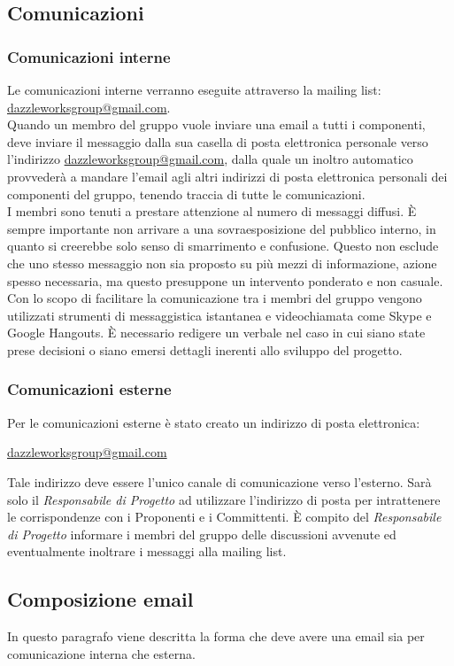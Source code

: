 	\subsection{Comunicazioni}
		\subsubsection{Comunicazioni interne}
Le comunicazioni interne verranno eseguite attraverso la mailing list: \url{dazzleworksgroup@gmail.com}. \\ 
Quando un membro del gruppo vuole inviare una email a tutti i componenti, deve inviare il messaggio dalla sua casella di posta elettronica personale verso l'indirizzo \url{dazzleworksgroup@gmail.com}, dalla quale un inoltro automatico provvederà a mandare l'email agli altri indirizzi di posta elettronica personali dei componenti del gruppo, tenendo traccia di tutte le comunicazioni.\\ 
I membri sono tenuti a prestare attenzione al numero di messaggi diffusi. È sempre importante non arrivare a una sovraesposizione del pubblico interno, in quanto si creerebbe solo senso di smarrimento e confusione. Questo non esclude che uno stesso messaggio non sia proposto su più mezzi di informazione, azione spesso necessaria, ma questo presuppone un intervento ponderato e non casuale.\\
Con lo scopo di facilitare la comunicazione tra i membri del gruppo vengono utilizzati strumenti di messaggistica istantanea e videochiamata come Skype e Google Hangouts.
È necessario redigere un \gls{verbale} nel caso in cui siano state prese decisioni o siano emersi dettagli inerenti allo sviluppo del progetto. 
		\subsubsection{Comunicazioni esterne}
Per le comunicazioni esterne è stato creato un indirizzo di posta elettronica:
\begin{center}
\url{dazzleworksgroup@gmail.com}
\end{center}
Tale indirizzo deve essere l'unico canale di comunicazione verso l'esterno. Sarà solo il \textit{Responsabile di Progetto} ad utilizzare l'indirizzo di posta per intrattenere le corrispondenze con i Proponenti e i Committenti. È compito del \textit{Responsabile di Progetto} informare i membri del gruppo delle discussioni avvenute ed eventualmente inoltrare i messaggi alla mailing list.

	\subsection{Composizione email}
In questo paragrafo viene descritta la forma che deve avere una email sia per comunicazione interna che esterna.
